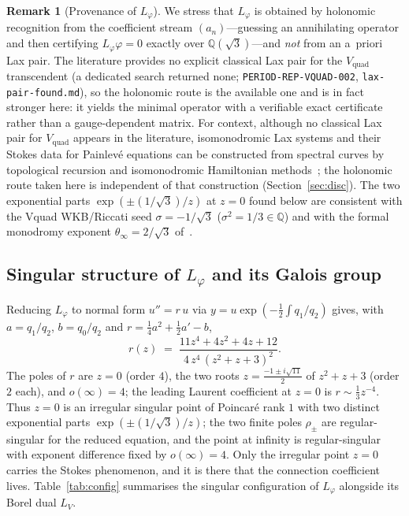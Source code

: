 \documentclass[11pt,reqno]{amsart}
\renewcommand{\_}{\vquadorigunderscore\allowbreak}
\theoremstyle{plain}
\theoremstyle{definition}
\newtheorem{remark}[theorem]{Remark}
\newcommand{\Vquad}{V_{\mathrm{quad}}}
\newcommand{\Lphi}{L_{\varphi}}
\newcommand{\LV}{L_{V}}
\newcommand{\Qsqrt}{\mathbb{Q}(\sqrt3)}
\begin{document}
\begin{remark}[Provenance of $\Lphi$]\label{rmk:provenance}
We stress that $\Lphi$ is obtained by holonomic recognition from the coefficient stream
$(a_n)$---guessing an annihilating operator and then certifying $\Lphi\varphi=0$ exactly over
$\Qsqrt$---and \emph{not} from an a~priori Lax pair. The literature provides no explicit classical
Lax pair for the $\Vquad$ transcendent (a dedicated search returned none;
\texttt{PERIOD-REP-VQUAD-002}, \texttt{lax-pair-found.md}), so the holonomic route is the available
one and is in fact stronger here: it yields the minimal operator with a verifiable exact
certificate rather than a gauge-dependent matrix. For context, although no classical Lax pair for
$\Vquad$ appears in the literature, isomonodromic Lax systems and their Stokes data for
Painlev\'e equations can be constructed from spectral curves by topological recursion and
isomonodromic Hamiltonian methods~\cite{MarchalOrantin,IwakiMarchalSaenz,MarchalAlameddine}; the
holonomic route taken here is independent of that construction (Section~\ref{sec:disc}). The two
exponential parts
$\exp(\pm(1/\sqrt3)/z)$ at $z=0$ found below are consistent with the V\_quad WKB/Riccati seed
$\sigma=-1/\sqrt3$ ($\sigma^2=1/3\in\mathbb{Q}$) and with the formal monodromy exponent
$\theta_\infty=2/\sqrt3$ of~\cite{Vquad}.
\end{remark}

\subsection{Singular structure of \texorpdfstring{$\Lphi$}{Lphi} and its Galois group}
Reducing $\Lphi$ to normal form $u''=r\,u$ via $y=u\exp(-\tfrac12\int q_1/q_2)$ gives, with
$a=q_1/q_2$, $b=q_0/q_2$ and $r=\tfrac14a^2+\tfrac12a'-b$,
\begin{equation}\label{eq:r}
  r(z)\;=\;\frac{11z^4+4z^2+4z+12}{\,4\,z^4\,(z^2+z+3)^2\,}.
\end{equation}
The poles of $r$ are $z=0$ (order $4$), the two roots $z=\tfrac{-1\pm i\sqrt{11}}2$ of $z^2+z+3$
(order $2$ each), and $o(\infty)=4$; the leading Laurent coefficient at $z=0$ is
$r\sim\tfrac13 z^{-4}$. Thus $z=0$ is an irregular singular point of Poincar\'e rank $1$ with two
distinct exponential parts $\exp(\pm(1/\sqrt3)/z)$; the two finite poles $\rho_\pm$ are
regular-singular for the reduced equation, and the point at infinity is regular-singular with
exponent difference fixed by $o(\infty)=4$. Only the irregular point $z=0$ carries the Stokes
phenomenon, and it is there that the connection coefficient lives. Table~\ref{tab:config}
summarises the singular configuration of $\Lphi$ alongside its Borel dual $\LV$.
\end{document}
